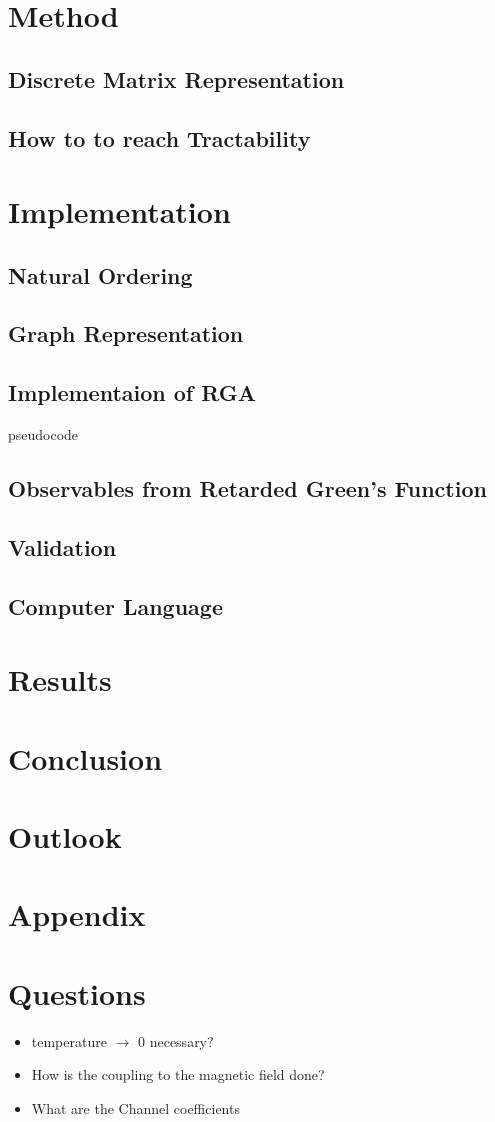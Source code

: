 \section{Method}
  \subsection{Discrete Matrix Representation}
  
  \subsection{How to to reach Tractability}
  
\section{Implementation}
\subsection{Natural Ordering}
\subsection{Graph Representation}
\subsection{Implementaion of RGA}
pseudocode
\subsection{Observables from Retarded Green's Function}
\subsection{Validation}
\subsection{Computer Language}
\section{Results}
\section{Conclusion}
\section{Outlook}
\section{Appendix}

\section{Questions}
\begin{itemize}
  \item temperature $\rightarrow$ 0 necessary?
  \item How is the coupling to the magnetic field done?
  \item What are the Channel coefficients \cite{PhysRevB.31.6207}
\end{itemize}

\clearpage




